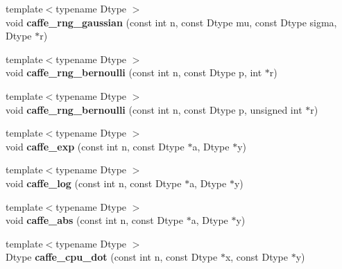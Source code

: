 \begin{DoxyCompactItemize}
\item 
{\footnotesize template$<$typename Dtype $>$ }\\void {\bfseries caffe\+\_\+rng\+\_\+gaussian} (const int n, const Dtype mu, const Dtype sigma, Dtype $\ast$r)\hypertarget{namespacecaffe_a935320ba9a5ca35d2c02efbb3c9fd4fa}{}\label{namespacecaffe_a935320ba9a5ca35d2c02efbb3c9fd4fa}

\item 
{\footnotesize template$<$typename Dtype $>$ }\\void {\bfseries caffe\+\_\+rng\+\_\+bernoulli} (const int n, const Dtype p, int $\ast$r)\hypertarget{namespacecaffe_af11e588b9a477a4ba11118f17de6874d}{}\label{namespacecaffe_af11e588b9a477a4ba11118f17de6874d}

\item 
{\footnotesize template$<$typename Dtype $>$ }\\void {\bfseries caffe\+\_\+rng\+\_\+bernoulli} (const int n, const Dtype p, unsigned int $\ast$r)\hypertarget{namespacecaffe_a3546fae02c039ca8a4dbc41b8415b84f}{}\label{namespacecaffe_a3546fae02c039ca8a4dbc41b8415b84f}

\item 
{\footnotesize template$<$typename Dtype $>$ }\\void {\bfseries caffe\+\_\+exp} (const int n, const Dtype $\ast$a, Dtype $\ast$y)\hypertarget{namespacecaffe_ae3dacc5c5bd60f1d15cadcb25c0c0720}{}\label{namespacecaffe_ae3dacc5c5bd60f1d15cadcb25c0c0720}

\item 
{\footnotesize template$<$typename Dtype $>$ }\\void {\bfseries caffe\+\_\+log} (const int n, const Dtype $\ast$a, Dtype $\ast$y)\hypertarget{namespacecaffe_a91f4d24e5d7a7194c3d07b9293ccf67e}{}\label{namespacecaffe_a91f4d24e5d7a7194c3d07b9293ccf67e}

\item 
{\footnotesize template$<$typename Dtype $>$ }\\void {\bfseries caffe\+\_\+abs} (const int n, const Dtype $\ast$a, Dtype $\ast$y)\hypertarget{namespacecaffe_ae9056cc88a6cf2eb7f67e64dc7231dc5}{}\label{namespacecaffe_ae9056cc88a6cf2eb7f67e64dc7231dc5}

\item 
{\footnotesize template$<$typename Dtype $>$ }\\Dtype {\bfseries caffe\+\_\+cpu\+\_\+dot} (const int n, const Dtype $\ast$x, const Dtype $\ast$y)\hypertarget{namespacecaffe_abc151e4d4c6f7a8c119457907bbe9138}{}\label{namespacecaffe_abc151e4d4c6f7a8c119457907bbe9138}


\end{DoxyCompactItemize}
